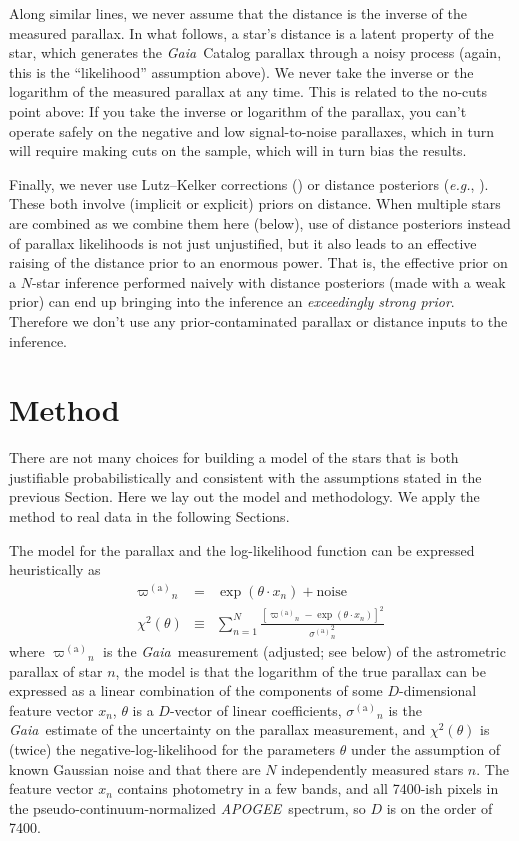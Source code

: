\documentclass[modern]{aastex62}
\newcommand{\sectionname}{Section}
\newcommand{\foreign}[1]{\textsl{#1}}
\newcommand{\eg}{\foreign{e.g.}}
\newcommand{\acronym}[1]{{\small{#1}}}
\newcommand{\project}[1]{\textsl{#1}}
\newcommand{\apogee}{\project{\acronym{APOGEE}}}
\newcommand{\gaia}{\project{Gaia}}
\newcommand{\gparallax}{{\varpi^{(\mathrm{a})}}}
\newcommand{\gsigma}{{\sigma^{(\mathrm{a})}}}
\begin{document}
Along similar lines, we never assume that the distance is the inverse of the
measured parallax.
In what follows, a star's distance is a latent property of the star, which generates
the \gaia\ Catalog parallax through a noisy process (again, this is
the ``likelihood'' assumption above).
We never take the inverse or the logarithm of the measured parallax at any time.
This is related to the no-cuts point above:
If you take the inverse or logarithm of the parallax, you can't operate safely
on the negative and low signal-to-noise parallaxes, which in turn will require
making cuts on the sample, which will in turn bias the results.

Finally, we never use Lutz--Kelker corrections (\citealt{lk}) or distance
posteriors (\eg, \citealt{calj}). These both involve (implicit or explicit) priors on 
distance.
When multiple stars are combined as we combine them here (below),
use of distance posteriors instead of parallax likelihoods is not just
unjustified, but it also leads to an
effective raising of the distance prior to an enormous power.
That is, the effective prior on a $N$-star inference performed naively
with distance posteriors (made with a weak prior) can end up
bringing into the inference an \emph{exceedingly
strong prior}.
Therefore we don't use any prior-contaminated parallax or distance
inputs to the inference.

\section{Method}

There are not many choices
for building a model of the stars that is both justifiable probabilistically
and consistent with the assumptions stated in the previous \sectionname.
Here we lay out the model and methodology.
We apply the method to real data in the following {\sectionname s}.

The model for the parallax
and the log-likelihood function can be expressed heuristically as
\begin{eqnarray}
\gparallax_n &=& \exp(\theta\cdot x_n) + \mbox{noise}
\\
\chi^2(\theta) &\equiv& \sum_{n=1}^N \frac{[\gparallax_n - \exp(\theta\cdot x_n)]^2}{\gsigma_n^2}
\end{eqnarray}
where
$\gparallax_n$ is the \gaia\ measurement (adjusted; see below) of the astrometric parallax of star $n$,
the model is that the logarithm of the true parallax
can be expressed as a linear combination of the components
of some $D$-dimensional feature vector $x_n$,
$\theta$ is a $D$-vector of linear coefficients,
$\gsigma_n$ is the \gaia\ estimate of the uncertainty on the parallax measurement,
and $\chi^2(\theta)$ is (twice) the negative-log-likelihood for the parameters $\theta$
under the assumption of known Gaussian noise and
that there are $N$ independently measured stars $n$.
The feature vector $x_n$ contains photometry in a few bands, and all 7400-ish pixels
in the pseudo-continuum-normalized \apogee\ spectrum, so $D$ is on the order of 7400.
\end{document}
